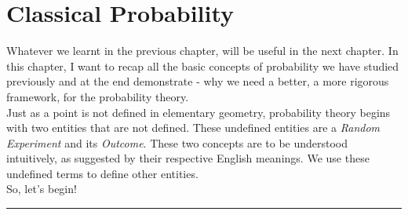 \chapter{Classical Probability}\cite{joeblitztein}

Whatever we learnt in the previous chapter, will be useful in the next chapter. In this chapter, I want to recap all the basic concepts of probability we have studied previously and at the end demonstrate - why we need a better, a more rigorous framework, for the probability theory. \\

Just as a point is not defined in elementary geometry, probability theory begins with two entities that are not defined. These undefined entities are a \textit{Random Experiment} and its \textit{Outcome}. These two concepts are to be understood intuitively, as suggested by their respective English meanings. We use these undefined terms to define other entities. \\

So, let's begin!










\vspace{10pt}
\hrule